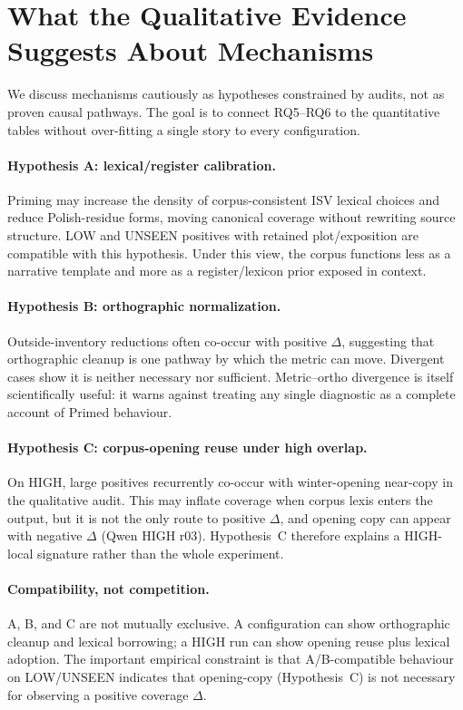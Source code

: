 \section{What the Qualitative Evidence Suggests About Mechanisms}
\label{sec:mechanisms}

We discuss mechanisms cautiously as hypotheses constrained by audits, not as proven causal pathways.
The goal is to connect RQ5--RQ6 to the quantitative tables without over-fitting a single story to every configuration.

\paragraph{Hypothesis A: lexical/register calibration.}
Priming may increase the density of corpus-consistent ISV lexical choices and reduce Polish-residue forms, moving canonical coverage without rewriting source structure.
LOW and UNSEEN positives with retained plot/exposition are compatible with this hypothesis.
Under this view, the corpus functions less as a narrative template and more as a register/lexicon prior exposed in context.

\paragraph{Hypothesis B: orthographic normalization.}
Outside-inventory reductions often co-occur with positive $\Delta$, suggesting that orthographic cleanup is one pathway by which the metric can move.
Divergent cases show it is neither necessary nor sufficient.
Metric--ortho divergence is itself scientifically useful: it warns against treating any single diagnostic as a complete account of Primed behaviour.

\paragraph{Hypothesis C: corpus-opening reuse under high overlap.}
On HIGH, large positives recurrently co-occur with winter-opening near-copy in the qualitative audit.
This may inflate coverage when corpus lexis enters the output, but it is not the only route to positive $\Delta$, and opening copy can appear with negative $\Delta$ (Qwen HIGH r03).
Hypothesis~C therefore explains a HIGH-local signature rather than the whole experiment.

\paragraph{Compatibility, not competition.}
A, B, and C are not mutually exclusive.
A configuration can show orthographic cleanup and lexical borrowing; a HIGH run can show opening reuse plus lexical adoption.
The important empirical constraint is that A/B-compatible behaviour on LOW/UNSEEN indicates that opening-copy (Hypothesis~C) is not necessary for observing a positive coverage $\Delta$.

